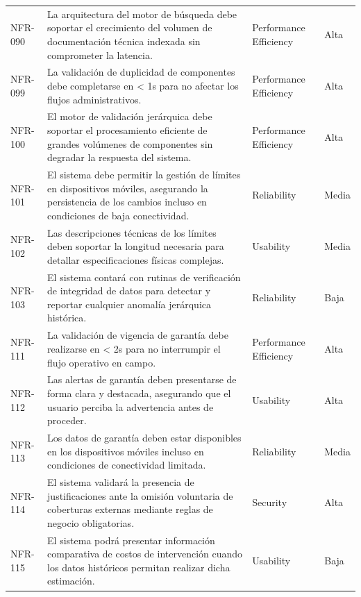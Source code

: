 \begin{longtable}{>{\raggedright\arraybackslash}p{} >{\raggedright\arraybackslash}p{} >{\raggedright\arraybackslash}p{} >{\raggedright\arraybackslash}p{}}
NFR-090 & La arquitectura del motor de búsqueda debe soportar el crecimiento del volumen de documentación técnica indexada sin comprometer la latencia. & Performance Efficiency & Alta \\
NFR-099 & La validación de duplicidad de componentes debe completarse en < 1s para no afectar los flujos administrativos. & Performance Efficiency & Alta \\
NFR-100 & El motor de validación jerárquica debe soportar el procesamiento eficiente de grandes volúmenes de componentes sin degradar la respuesta del sistema. & Performance Efficiency & Alta \\
NFR-101 & El sistema debe permitir la gestión de límites en dispositivos móviles, asegurando la persistencia de los cambios incluso en condiciones de baja conectividad. & Reliability & Media \\
NFR-102 & Las descripciones técnicas de los límites deben soportar la longitud necesaria para detallar especificaciones físicas complejas. & Usability & Media \\
NFR-103 & El sistema contará con rutinas de verificación de integridad de datos para detectar y reportar cualquier anomalía jerárquica histórica. & Reliability & Baja \\
NFR-111 & La validación de vigencia de garantía debe realizarse en < 2s para no interrumpir el flujo operativo en campo. & Performance Efficiency & Alta \\
NFR-112 & Las alertas de garantía deben presentarse de forma clara y destacada, asegurando que el usuario perciba la advertencia antes de proceder. & Usability & Alta \\
NFR-113 & Los datos de garantía deben estar disponibles en los dispositivos móviles incluso en condiciones de conectividad limitada. & Reliability & Media \\
NFR-114 & El sistema validará la presencia de justificaciones ante la omisión voluntaria de coberturas externas mediante reglas de negocio obligatorias. & Security & Alta \\
NFR-115 & El sistema podrá presentar información comparativa de costos de intervención cuando los datos históricos permitan realizar dicha estimación. & Usability & Baja \\
\bottomrule
\end{longtable}
\normalsize